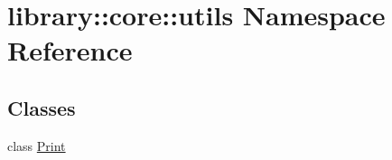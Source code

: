 \hypertarget{namespacelibrary_1_1core_1_1utils}{}\section{library\+::core\+::utils Namespace Reference}
\label{namespacelibrary_1_1core_1_1utils}
\subsection*{Classes}
\begin{DoxyCompactItemize}
\item 
class \mbox{\hyperlink{classlibrary_1_1core_1_1utils_1_1_print}{Print}}
\end{DoxyCompactItemize}
